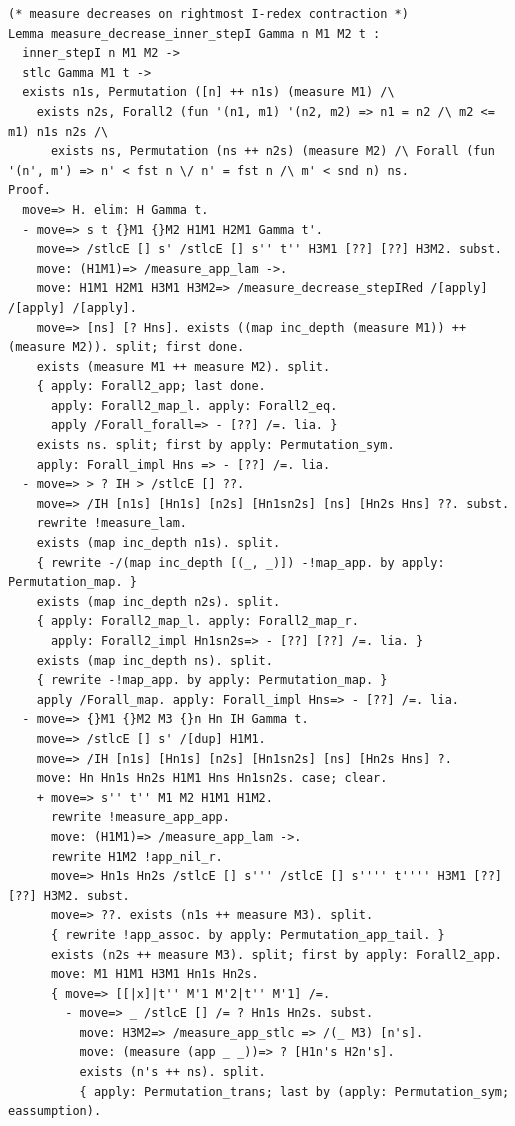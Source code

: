 \documentclass[10pt,a4paper]{article}
\begin{document}
\begin{lstlisting}[style=authorcoq]
(* measure decreases on rightmost I-redex contraction *)
Lemma measure_decrease_inner_stepI Gamma n M1 M2 t :
  inner_stepI n M1 M2 ->
  stlc Gamma M1 t ->
  exists n1s, Permutation ([n] ++ n1s) (measure M1) /\
    exists n2s, Forall2 (fun '(n1, m1) '(n2, m2) => n1 = n2 /\ m2 <= m1) n1s n2s /\
      exists ns, Permutation (ns ++ n2s) (measure M2) /\ Forall (fun '(n', m') => n' < fst n \/ n' = fst n /\ m' < snd n) ns.
Proof.
  move=> H. elim: H Gamma t.
  - move=> s t {}M1 {}M2 H1M1 H2M1 Gamma t'.
    move=> /stlcE [] s' /stlcE [] s'' t'' H3M1 [??] [??] H3M2. subst.
    move: (H1M1)=> /measure_app_lam ->.
    move: H1M1 H2M1 H3M1 H3M2=> /measure_decrease_stepIRed /[apply] /[apply] /[apply].
    move=> [ns] [? Hns]. exists ((map inc_depth (measure M1)) ++ (measure M2)). split; first done.
    exists (measure M1 ++ measure M2). split.
    { apply: Forall2_app; last done.
      apply: Forall2_map_l. apply: Forall2_eq.
      apply /Forall_forall=> - [??] /=. lia. }
    exists ns. split; first by apply: Permutation_sym.
    apply: Forall_impl Hns => - [??] /=. lia.
  - move=> > ? IH > /stlcE [] ??.
    move=> /IH [n1s] [Hn1s] [n2s] [Hn1sn2s] [ns] [Hn2s Hns] ??. subst.
    rewrite !measure_lam.
    exists (map inc_depth n1s). split.
    { rewrite -/(map inc_depth [(_, _)]) -!map_app. by apply: Permutation_map. }
    exists (map inc_depth n2s). split.
    { apply: Forall2_map_l. apply: Forall2_map_r.
      apply: Forall2_impl Hn1sn2s=> - [??] [??] /=. lia. }
    exists (map inc_depth ns). split.
    { rewrite -!map_app. by apply: Permutation_map. }
    apply /Forall_map. apply: Forall_impl Hns=> - [??] /=. lia.
  - move=> {}M1 {}M2 M3 {}n Hn IH Gamma t.
    move=> /stlcE [] s' /[dup] H1M1.
    move=> /IH [n1s] [Hn1s] [n2s] [Hn1sn2s] [ns] [Hn2s Hns] ?.
    move: Hn Hn1s Hn2s H1M1 Hns Hn1sn2s. case; clear.
    + move=> s'' t'' M1 M2 H1M1 H1M2.
      rewrite !measure_app_app.
      move: (H1M1)=> /measure_app_lam ->.
      rewrite H1M2 !app_nil_r.
      move=> Hn1s Hn2s /stlcE [] s''' /stlcE [] s'''' t'''' H3M1 [??] [??] H3M2. subst.
      move=> ??. exists (n1s ++ measure M3). split.
      { rewrite !app_assoc. by apply: Permutation_app_tail. }
      exists (n2s ++ measure M3). split; first by apply: Forall2_app.
      move: M1 H1M1 H3M1 Hn1s Hn2s.
      { move=> [[|x]|t'' M'1 M'2|t'' M'1] /=.
        - move=> _ /stlcE [] /= ? Hn1s Hn2s. subst.
          move: H3M2=> /measure_app_stlc => /(_ M3) [n's].
          move: (measure (app _ _))=> ? [H1n's H2n's].
          exists (n's ++ ns). split.
          { apply: Permutation_trans; last by (apply: Permutation_sym; eassumption).

\end{lstlisting}
\end{document}
